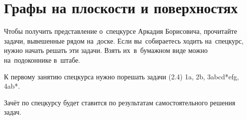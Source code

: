 
\section*{Графы на плоскости и поверхностях}



Чтобы получить представление о~спецкурсе Аркадия Борисовича, прочитайте задачи,
вывешенные рядом на~доске.
Если вы~собираетесь ходить на~спецкурс, нужно начать решать эти задачи.
Взять их~в~бумажном виде можно на~подоконнике в~штабе.

К первому занятию спецкурса нужно порешать задачи
(2.4) 1a, 2b, 3abcd*efg, 4ab*.

Зачёт по спецкурсу будет ставится по результатам самостоятельного решения
задач.

